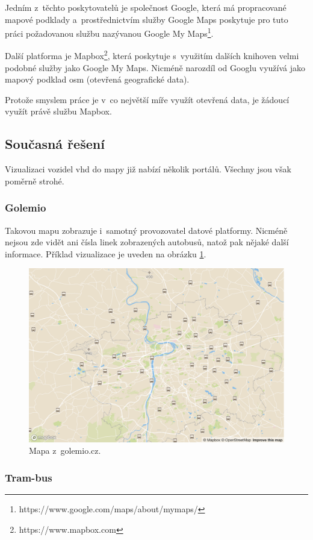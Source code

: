 \bigbreak

Jedním z~těchto poskytovatelů je společnost Google, která má propracované mapové podklady a~prostřednictvím služby Google Maps poskytuje pro tuto práci požadovanou službu nazývanou Google My Maps\footnote{https://www.google.com/maps/about/mymaps/}.

\bigbreak

Další platforma je Mapbox\footnote{https://www.mapbox.com}, která poskytuje s~využitím dalších knihoven velmi podobné služby jako Google My Maps. Nicméně narozdíl od Googlu využívá jako mapový podklad \gls{osm} (otevřená geografické data).

\bigbreak

Protože smyslem práce je v~co největší míře využít otevřená data, je žádoucí využít právě službu Mapbox.

\subsection{Současná řešení} \label{subsection:soucasna_reseni_front_end}

Vizualizaci vozidel \gls{vhd} do mapy již nabízí několik portálů. Všechny jsou však poměrně strohé.

\subsubsection{Golemio}

Takovou mapu zobrazuje i~samotný provozovatel datové platformy. Nicméně nejsou zde vidět ani čísla linek zobrazených autobusů, natož pak nějaké další informace. Příklad vizualizace je uveden na obrázku \ref{fig:golemio_result}.

\begin{figure}
	\centering
  \includegraphics[width=0.5\linewidth]{../img/golemio_mapa.png}
  \caption{Mapa z~golemio.cz.}
  \label{fig:golemio_result}
\end{figure}

\subsubsection{Tram-bus}

